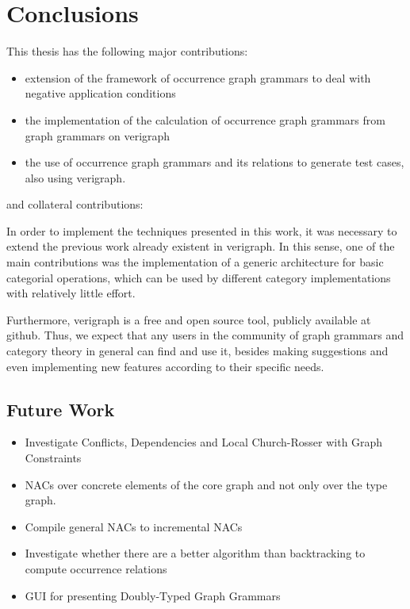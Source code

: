 \chapter{Conclusions}\label{ch:conclusions}

This thesis has the following major contributions:

\begin{itemize}
  \item extension of the framework of occurrence graph grammars to deal with negative application conditions
  \item the implementation of the calculation of occurrence graph grammars from graph grammars on verigraph
  \item the use of occurrence graph grammars and its relations to generate test cases, also using verigraph.
\end{itemize}

and collateral contributions:

  In order to implement the techniques presented in this work, it was necessary to extend the previous work already existent in verigraph. In this sense, one of the main contributions was the implementation of a generic architecture for basic categorial operations, which can be used by different category implementations with relatively little effort.

    Furthermore, verigraph is a free and open source tool, publicly available at github. Thus, we expect that any users in the community of graph grammars and category theory in general can find and use it, besides making suggestions and even implementing new features according to their specific needs.

\section{Future Work}

\begin{itemize}
  \item Investigate Conflicts, Dependencies and Local Church-Rosser with Graph Constraints
  \item NACs over concrete elements of the core graph and not only over the type graph. 
  \item Compile general NACs to incremental NACs
  \item Investigate whether there are a better algorithm than backtracking to compute occurrence relations
  \item GUI for presenting Doubly-Typed Graph Grammars
\end{itemize}
